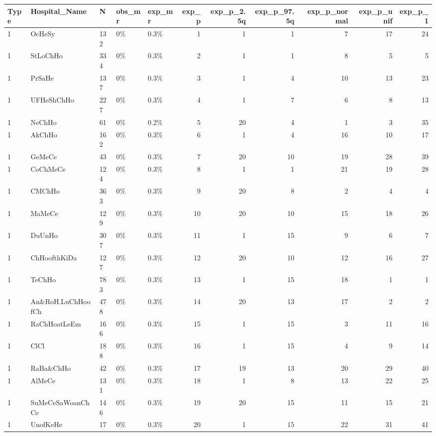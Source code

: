 \begin{longtable}{lllllrrrrrr}
  \hline
Type & Hospital\_Name & N & obs\_mr & exp\_mr & exp\_p & exp\_p\_2.5q & exp\_p\_97.5q & exp\_p\_normal & exp\_p\_unif & exp\_p\_1 \\ 
  \hline
1 & OcHeSy & 132 & 0\% & 0.3\% &   1 &   1 &   1 &   7 &  17 &  24 \\ 
  1 & StLoChHo & 334 & 0\% & 0.3\% &   2 &   1 &   1 &   8 &   5 &   5 \\ 
  1 & PrSaHe & 137 & 0\% & 0.3\% &   3 &   1 &   4 &  10 &  13 &  23 \\ 
  1 & UFHeShChHo & 227 & 0\% & 0.3\% &   4 &   1 &   7 &   6 &   8 &  13 \\ 
  1 & NeChHo & 61 & 0\% & 0.2\% &   5 &  20 &   4 &   1 &   3 &  35 \\ 
  1 & AkChHo & 162 & 0\% & 0.3\% &   6 &   1 &   4 &  16 &  10 &  17 \\ 
  1 & GeMeCe & 43 & 0\% & 0.3\% &   7 &  20 &  10 &  19 &  28 &  39 \\ 
  1 & CoChMeCe & 124 & 0\% & 0.3\% &   8 &   1 &   1 &  21 &  19 &  28 \\ 
  1 & CMChHo & 363 & 0\% & 0.3\% &   9 &  20 &   8 &   2 &   4 &   4 \\ 
  1 & MaMeCe & 129 & 0\% & 0.3\% &  10 &  20 &  10 &  15 &  18 &  26 \\ 
  1 & DuUnHo & 307 & 0\% & 0.3\% &  11 &   1 &  15 &   9 &   6 &   7 \\ 
  1 & ChHoofthKiDa & 127 & 0\% & 0.3\% &  12 &  20 &  10 &  12 &  16 &  27 \\ 
  1 & TeChHo & 783 & 0\% & 0.3\% &  13 &   1 &  15 &  18 &   1 &   1 \\ 
  1 & An\&RoH.LuChHoofCh & 478 & 0\% & 0.3\% &  14 &  20 &  13 &  17 &   2 &   2 \\ 
  1 & RaChHoatLeEm & 166 & 0\% & 0.3\% &  15 &   1 &  15 &   3 &  11 &  16 \\ 
  1 & ClCl & 188 & 0\% & 0.3\% &  16 &   1 &  15 &   4 &   9 &  14 \\ 
  1 & RaBa\&ChHo & 42 & 0\% & 0.3\% &  17 &  19 &  13 &  20 &  29 &  40 \\ 
  1 & AlMeCe & 131 & 0\% & 0.3\% &  18 &   1 &   8 &  13 &  22 &  25 \\ 
  1 & SuMeCeSaWoanChCe & 146 & 0\% & 0.3\% &  19 &  20 &  15 &  11 &  15 &  21 \\ 
  1 & UnofKeHe & 17 & 0\% & 0.3\% &  20 &   1 &  15 &  22 &  31 &  41 \\ 

\end{longtable}
